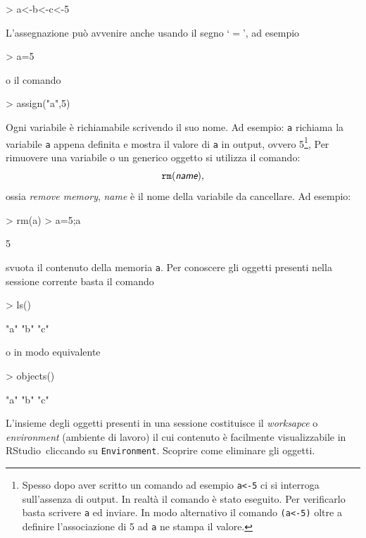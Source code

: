\documentclass[onecolumn,11pt]{book}
\newcommand{\varia}[1]{\textsl{\textsf{#1}}}
\newcommand{\rst}{\textsf{RStudio}~}
\begin{document}
\begin{Schunk}
\begin{Sinput}
> a<-b<-c<-5
\end{Sinput}
\end{Schunk}
L'assegnazione pu\`o avvenire anche usando il segno `$=$', ad esempio
\begin{Schunk}
\begin{Sinput}
> a=5
\end{Sinput}
\end{Schunk}
o il comando
\begin{Schunk}
\begin{Sinput}
> assign("a",5)
\end{Sinput}
\end{Schunk}
Ogni variabile \`e richiamabile scrivendo il suo nome.
Ad esempio:
\texttt{a} richiama la variabile \texttt{a} appena definita e mostra il valore di \texttt{a} in output, ovvero 5\footnote{Spesso
dopo aver scritto un comando ad esempio \texttt{a<-5} ci si interroga sull'assenza di output. In realt\`a il comando \`e stato eseguito. Per verificarlo basta scrivere \texttt{a} ed inviare. In modo alternativo il comando  \texttt{(a<-5)} oltre a definire l'associazione di 5 ad \texttt{a} ne stampa il valore.},
Per rimuovere una variabile o un generico oggetto si utilizza il comando:
$$\texttt{rm}(\varia{name}),$$
 ossia {\it remove memory}, \varia{name} \`e il nome della variabile da cancellare. Ad  esempio:
\begin{Schunk}
\begin{Sinput}
> rm(a)
> a=5;a
\end{Sinput}
\begin{Soutput}
[1] 5
\end{Soutput}
\end{Schunk}
svuota il contenuto della memoria \texttt{a}. Per conoscere gli oggetti presenti nella sessione corrente basta il comando
\begin{Schunk}
\begin{Sinput}
> ls()
\end{Sinput}
\begin{Soutput}
[1] "a" "b" "c"
\end{Soutput}
\end{Schunk}
o in modo equivalente
\begin{Schunk}
\begin{Sinput}
> objects()
\end{Sinput}
\begin{Soutput}
[1] "a" "b" "c"
\end{Soutput}
\end{Schunk}
L'insieme degli oggetti presenti in una sessione costituisce il \textsl{worksapce} o \textsl{environment} (ambiente di lavoro) il cui contenuto \`e facilmente visualizzabile in \rst   cliccando su \texttt{Environment}.
Scoprire come eliminare gli oggetti.
\end{document}
